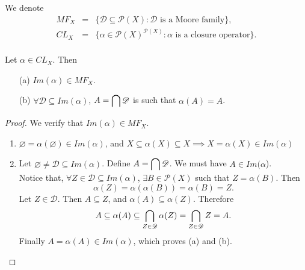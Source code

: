 \documentclass{amsart}
\begin{document}
\begin{definition}
We denote
\[
\begin{array}{rcl}
MF_X & = & \{
	\mathscr{D} \subseteq \mathscr{P} (X) :
	\mathscr{D} \mbox{ is a Moore family}
\}, \\ 
CL_X & = &  \{
\alpha \in \mathscr{P}(X) ^{ \mathscr{P} (X)} :
\alpha \mbox{ is a closure operator}
\}.\\
\end{array}
\]
\end{definition}

\begin{lemma}
Let \(\alpha \in CL_X\).
Then 
\begin{enumerate}
\item[(a)] \(Im (\alpha) \in MF_X\). 
\item[(b)] \(\forall \mathscr{D} \subseteq Im(\alpha)\),
\(A = \displaystyle\bigcap \mathscr{D}\) is such that \(\alpha (A) = A\).
\end{enumerate}
\label{image:lem}
\end{lemma}
\begin{proof}
We verify that \(Im(\alpha) \in MF_X\).
\begin{enumerate}
\item
\(\varnothing = \alpha (\varnothing) \in Im(\alpha)\), and 
\(X \subseteq \alpha (X) \subseteq X \implies X = \alpha (X) \in Im(\alpha)\)
\item 
Let \(\varnothing \neq \mathscr{D} \subseteq Im (\alpha)\). 
Define \(A = \displaystyle\bigcap \mathscr{D}\).
We must have \(A \in Im (\alpha\)). \\ 
Notice that, \(\forall Z \in \mathscr{D} \subseteq Im(\alpha)\), 
\(\exists B \in \mathscr{P} (X)\) such that \(Z = \alpha (B)\). 
Then
\[
\alpha (Z) = \alpha (\alpha (B)) = \alpha (B) = Z.
\]
Let \(Z \in \mathscr{D}\). 
Then \(A \subseteq Z\), and \(\alpha (A) \subseteq \alpha (Z)\).
Therefore
\[
A \subseteq \alpha (A) \subseteq \displaystyle\bigcap_{Z \in \mathscr{D}} \alpha (Z) 
= \displaystyle\bigcap_{Z \in \mathscr{D}} Z = A.
\]
Finally \(A = \alpha (A) \in Im(\alpha)\), which proves (a) and (b).
\end{enumerate}
\end{proof}
\end{document}
